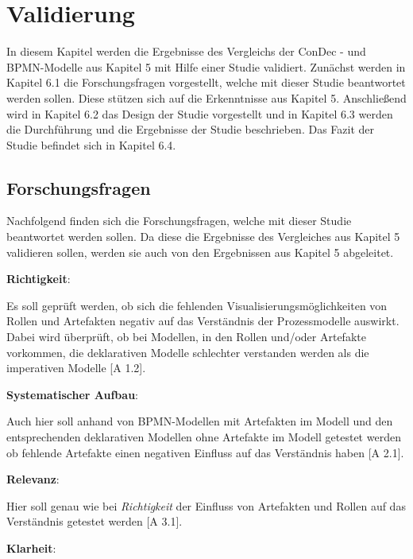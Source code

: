 \chapter{Validierung}\label{sec:chapter7}

In diesem Kapitel werden die Ergebnisse des Vergleichs der ConDec - und BPMN-Modelle aus Kapitel 5 mit Hilfe einer Studie validiert. Zunächst werden in Kapitel 6.1 die Forschungsfragen vorgestellt, welche mit dieser Studie beantwortet werden sollen. Diese stützen sich auf die Erkenntnisse aus Kapitel 5. Anschließend wird in Kapitel 6.2 das Design der Studie vorgestellt und in Kapitel 6.3 werden die Durchführung und die Ergebnisse der Studie beschrieben. Das Fazit der Studie befindet sich in Kapitel 6.4. \newline


\section{Forschungsfragen}
Nachfolgend finden sich die Forschungsfragen, welche mit dieser Studie beantwortet werden sollen. Da diese die Ergebnisse des Vergleiches aus Kapitel 5 validieren sollen, werden sie auch von den Ergebnissen aus Kapitel 5 abgeleitet.\newline

\textbf{Richtigkeit}: 

Es soll geprüft werden, ob sich die fehlenden Visualisierungsmöglichkeiten von Rollen und Artefakten negativ auf das Verständnis der Prozessmodelle auswirkt. Dabei wird überprüft, ob bei Modellen, in den Rollen und/oder Artefakte vorkommen, die deklarativen Modelle schlechter verstanden werden als die imperativen Modelle [A 1.2].\newline

\textbf{Systematischer Aufbau}: 

Auch hier soll anhand von BPMN-Modellen mit Artefakten im Modell und den entsprechenden deklarativen Modellen ohne Artefakte im Modell getestet werden ob fehlende Artefakte einen negativen Einfluss auf das Verständnis haben [A 2.1].\newline

\textbf{Relevanz}: 

Hier soll genau wie bei \textit{Richtigkeit} der Einfluss von Artefakten und Rollen auf das Verständnis getestet werden [A 3.1]. \newline

\textbf{Klarheit}: 

